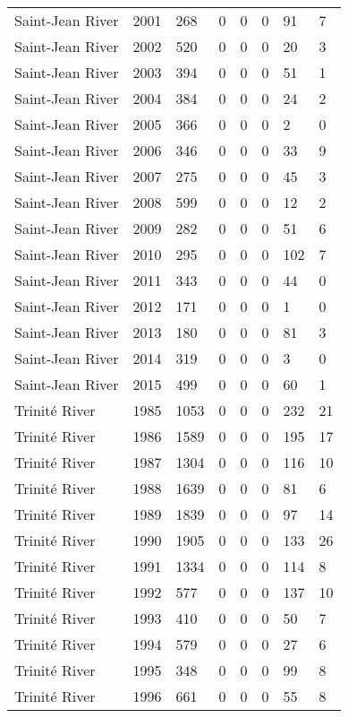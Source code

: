 \begin{longtable}{p{3cm}p{1cm}p{1.3cm}p{1.3cm}p{1.3cm}p{1.3cm}p{1.3cm}p{1.3cm}}
  Saint-Jean River & 2001 & 268 & 0 & 0 & 0 & 91 & 7 \\ 
  Saint-Jean River & 2002 & 520 & 0 & 0 & 0 & 20 & 3 \\ 
  Saint-Jean River & 2003 & 394 & 0 & 0 & 0 & 51 & 1 \\ 
  Saint-Jean River & 2004 & 384 & 0 & 0 & 0 & 24 & 2 \\ 
  Saint-Jean River & 2005 & 366 & 0 & 0 & 0 & 2 & 0 \\ 
  Saint-Jean River & 2006 & 346 & 0 & 0 & 0 & 33 & 9 \\ 
  Saint-Jean River & 2007 & 275 & 0 & 0 & 0 & 45 & 3 \\ 
  Saint-Jean River & 2008 & 599 & 0 & 0 & 0 & 12 & 2 \\ 
  Saint-Jean River & 2009 & 282 & 0 & 0 & 0 & 51 & 6 \\ 
  Saint-Jean River & 2010 & 295 & 0 & 0 & 0 & 102 & 7 \\ 
  Saint-Jean River & 2011 & 343 & 0 & 0 & 0 & 44 & 0 \\ 
  Saint-Jean River & 2012 & 171 & 0 & 0 & 0 & 1 & 0 \\ 
  Saint-Jean River & 2013 & 180 & 0 & 0 & 0 & 81 & 3 \\ 
  Saint-Jean River & 2014 & 319 & 0 & 0 & 0 & 3 & 0 \\ 
  Saint-Jean River & 2015 & 499 & 0 & 0 & 0 & 60 & 1 \\ 
  Trinité River & 1985 & 1053 & 0 & 0 & 0 & 232 & 21 \\ 
  Trinité River & 1986 & 1589 & 0 & 0 & 0 & 195 & 17 \\ 
  Trinité River & 1987 & 1304 & 0 & 0 & 0 & 116 & 10 \\ 
  Trinité River & 1988 & 1639 & 0 & 0 & 0 & 81 & 6 \\ 
  Trinité River & 1989 & 1839 & 0 & 0 & 0 & 97 & 14 \\ 
  Trinité River & 1990 & 1905 & 0 & 0 & 0 & 133 & 26 \\ 
  Trinité River & 1991 & 1334 & 0 & 0 & 0 & 114 & 8 \\ 
  Trinité River & 1992 & 577 & 0 & 0 & 0 & 137 & 10 \\ 
  Trinité River & 1993 & 410 & 0 & 0 & 0 & 50 & 7 \\ 
  Trinité River & 1994 & 579 & 0 & 0 & 0 & 27 & 6 \\ 
  Trinité River & 1995 & 348 & 0 & 0 & 0 & 99 & 8 \\ 
  Trinité River & 1996 & 661 & 0 & 0 & 0 & 55 & 8 \\ 

\end{longtable}
